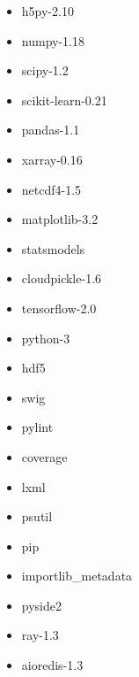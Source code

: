 \begin{itemize}
  \item h5py-2.10
  \item numpy-1.18
  \item scipy-1.2
  \item scikit-learn-0.21
  \item pandas-1.1
  \item xarray-0.16
  \item netcdf4-1.5
  \item matplotlib-3.2
  \item statsmodels
  \item cloudpickle-1.6
  \item tensorflow-2.0
  \item python-3
  \item hdf5
  \item swig
  \item pylint
  \item coverage
  \item lxml
  \item psutil
  \item pip
  \item importlib\_metadata
  \item pyside2
  \item ray-1.3
  \item aioredis-1.3
\end{itemize}
